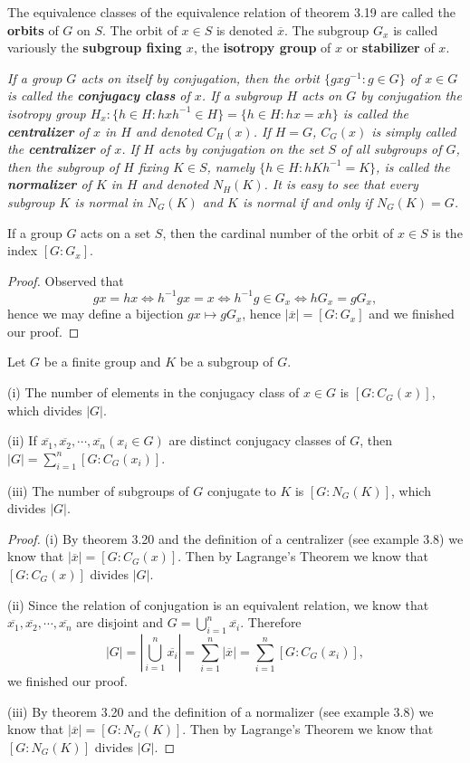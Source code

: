 The equivalence classes of the equivalence relation of theorem 3.19 are called the \textbf{orbits} of $G$ on $S$. The orbit of $x\in S$ is denoted $\overline{x}$. The subgroup $G_x$ is called variously the \textbf{subgroup fixing $x$}, the \textbf{isotropy group} of $x$ or \textbf{stabilizer} of $x$.
\begin{example}\em
If a group $G$ acts on itself by conjugation, then the orbit $\{gxg^{-1}:g\in G\}$ of $x\in G$ is called the \textbf{conjugacy class} of $x$. If a subgroup $H$ acts on $G$ by conjugation the isotropy group $H_x:\{h\in H:hxh^{-1}\in H\}=\{h\in H:hx=xh\}$ is called the \textbf{centralizer} of $x$ in $H$ and denoted $C_H(x)$. If $H=G$, $C_G(x)$ is simply called the \textbf{centralizer} of $x$. If $H$ acts by conjugation on the set $S$ of all subgroups of $G$, then the subgroup of $H$ fixing $K\in S$, namely $\{h\in H:hKh^{-1}=K\}$, is called the \textbf{normalizer} of $K$ in $H$ and denoted $N_H(K)$. It is easy to see that every subgroup $K$ is normal in $N_G(K)$ and $K$ is normal if and only if $N_G(K)=G$.
\end{example}
\begin{theorem}
If a group $G$ acts on a set $S$, then the cardinal number of the orbit of $x\in S$ is the index $[G:G_x]$.
\end{theorem}
\begin{proof}
Observed that 
$$
gx=hx\Leftrightarrow h^{-1}gx=x\Leftrightarrow h^{-1}g\in G_x\Leftrightarrow hG_x=gG_x,
$$
hence we may define a bijection $gx\mapsto gG_x$, hence $|\overline{x}|=[G:G_x]$ and we finished our proof.
\end{proof}
\begin{corollary}
Let $G$ be a finite group and $K$ be a subgroup of $G$.\par
(i) The number of elements in the conjugacy class of $x\in G$ is $[G:C_G(x)]$, which divides $|G|$.\par
(ii) If $\overline{x_1},\overline{x_2},\cdots ,\overline{x_n}\left( x_i\in G \right) $ are distinct conjugacy classes of $G$, then $\left| G \right|=\sum_{i=1}^n{\left[ G:C_G\left( x_i \right) \right]}$.\par
(iii) The number of subgroups of $G$ conjugate to $K$ is $[G:N_G(K)]$, which divides $|G|$.
\end{corollary}
\begin{proof}
(i) By theorem 3.20 and the definition of a centralizer (see example 3.8) we know that $|\overline{x}|=[G:C_G(x)]$. Then by Lagrange's Theorem we know that $[G:C_G(x)]$ divides $|G|$.\par
(ii) Since the relation of conjugation is an equivalent relation, we know that $\overline{x_1},\overline{x_2},\cdots,\overline{x_n}$ are disjoint and $G=\bigcup_{i=1}^n{\overline{x_i}}$. Therefore 
$$
\left| G \right|=\left| \bigcup_{i=1}^n{\overline{x_i}} \right|=\sum_{i=1}^n{\left| \overline{x} \right|}=\sum_{i=1}^n{\left[ G:C_G\left( x_i \right) \right]},
$$
we finished our proof.\par
(iii)  By theorem 3.20 and the definition of a normalizer (see example 3.8) we know that $|\overline{x}|=[G:N_G(K)]$. Then by Lagrange's Theorem we know that $[G:N_G(K)]$ divides $|G|$.
\end{proof}

